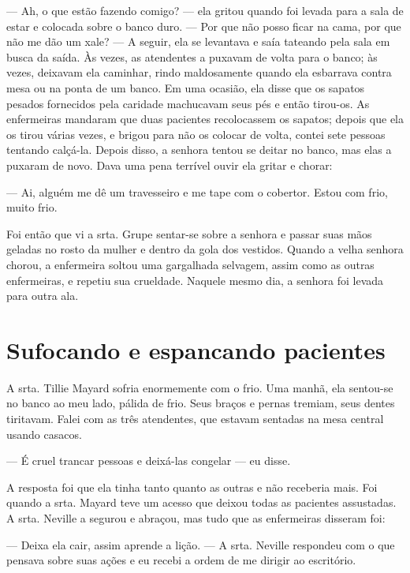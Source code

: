 --- Ah, o que estão fazendo comigo? --- ela gritou quando foi levada
para a sala de estar e colocada sobre o banco duro. --- Por que não
posso ficar na cama, por que não me dão um xale? --- A seguir, ela se
levantava e saía tateando pela sala em busca da saída. Às vezes, as
atendentes a puxavam de volta para o banco; às vezes, deixavam ela
caminhar, rindo maldosamente quando ela esbarrava contra mesa ou na
ponta de um banco. Em uma ocasião, ela disse que os sapatos pesados
fornecidos pela caridade machucavam seus pés e então tirou-os. As
enfermeiras mandaram que duas pacientes recolocassem os sapatos; depois
que ela os tirou várias vezes, e brigou para não os colocar de volta,
contei sete pessoas tentando calçá-la. Depois disso, a senhora tentou se
deitar no banco, mas elas a puxaram de novo. Dava uma pena terrível
ouvir ela gritar e chorar:

--- Ai, alguém me dê um travesseiro e me tape com o cobertor. Estou com
frio, muito frio.

Foi então que vi a srta. Grupe sentar-se sobre a senhora e passar suas
mãos geladas no rosto da mulher e dentro da gola dos vestidos. Quando a
velha senhora chorou, a enfermeira soltou uma gargalhada selvagem, assim
como as outras enfermeiras, e repetiu sua crueldade. Naquele mesmo dia,
a senhora foi levada para outra ala.

\label{section-7}

\chapter{Sufocando e espancando
pacientes}\label{capuxedtulo-xiii-sufocando-e-espancando-pacientes}

A srta. Tillie Mayard sofria enormemente com o frio. Uma manhã, ela
sentou-se no banco ao meu lado, pálida de frio. Seus braços e pernas
tremiam, seus dentes tiritavam. Falei com as três atendentes, que
estavam sentadas na mesa central usando casacos.

--- É cruel trancar pessoas e deixá-las congelar --- eu disse. 

A
resposta foi que ela tinha tanto quanto as outras e não receberia mais.
Foi quando a srta. Mayard teve um acesso que deixou todas as pacientes
assustadas. A srta. Neville a segurou e abraçou, mas tudo que as
enfermeiras disseram foi:

--- Deixa ela cair, assim aprende a lição. --- A srta. Neville respondeu
com o que pensava sobre suas ações e eu recebi a ordem de me dirigir ao
escritório.

